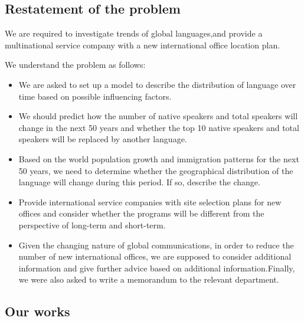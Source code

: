 \subsection{Restatement of the problem}
\noindent
We are required to investigate trends of global languages,and provide a multinational service company with a new international office location plan.

We understand the problem as follows:

	\begin{itemize}
		\item
We are asked to set up a model to describe the distribution of language over time based on possible influencing factors.
		\item
We should predict how the number of native speakers and total speakers will change in the next 50 years and whether the top 10 native speakers and total speakers will be replaced by another language.
		 \item
Based on the world population growth and immigration patterns for the next 50 years, we need to determine whether the geographical distribution of the language will change during this period. If so, describe the change.
		 \item 
Provide international service companies with site selection plans for new offices and consider whether the programs will be different from the perspective of long-term and short-term.
		\item 
Given the changing nature of global communications, in order to reduce the number of new international offices, we are supposed to consider additional information and give further advice based on additional information.Finally, we were also asked to write a memorandum to the relevant department. 		 	 
	\end{itemize}



\subsection{Our works}